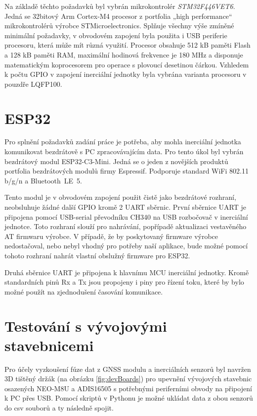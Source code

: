 

Na základě těchto požadavků byl vybrán mikrokontrolér \emph{STM32F446VET6}. Jedná se 32bitový Arm Cortex-M4 procesor z portfolia „high performance“ mikrokontrolérů výrobce STMicroelectronics. Splňuje všechny výše zmíněné minimální požadavky, v obvodovém zapojení byla použita i USB periferie procesoru, která může mít různá využití. Procesor obsahuje 512 kB paměti Flash a 128 kB paměti RAM, maximální hodinová frekvence je 180 MHz a disponuje matematickým koprocesorem pro operace s plovoucí desetinou čárkou. Vzhledem k počtu GPIO v zapojení inerciální jednotky byla vybrána varianta procesoru v pouzdře LQFP100. \cite{csdGtKJDMSdbwJ9r}

\section{ESP32}
Pro splnění požadavků zadání práce je potřeba, aby mohla inerciální jednotka komunikovat bezdrátově s PC zpracovávajícím data. Pro tento úkol byl vybrán bezdrátový modul ESP32-C3-Mini. Jedná se o jeden z novějších produktů portfolia bezdrátových modulů firmy Espressif. Podporuje standard WiFi 802.11 b/g/n a Bluetooth~LE~5. \cite{zJ7x5ye8Y5eJn1E2}

Tento modul je v obvodovém zapojení použit čistě jako bezdrátové rozhraní, neobsluhuje žádné další GPIO kromě 2 UART sběrnic. První sběrnice UART je připojena pomocí USB-serial převodníku CH340 na USB rozbočovač v inerciální jednotce. Toto rozhraní slouží pro nahrávání, popřípadě aktualizaci vestavěného AT firmwaru výrobce. V případě, že by poskytovaný firmware výrobce nedostačoval, nebo nebyl vhodný pro potřeby naší aplikace, bude možné pomocí tohoto rozhraní nahrát vlastní obslužný firmware pro ESP32.

Druhá sběrnice UART je připojena k hlavnímu MCU inerciální jednotky. Kromě standardních pinů Rx a Tx jsou propojeny i piny pro řízení toku, které by bylo možné použít na zjednodušení časování komunikace.

\section{Testování s vývojovými stavebnicemi}
Pro účely vyzkoušení fúze dat z GNSS modulu a inerciálních senzorů byl navržen 3D tištěný držák (na obrázku \ref{fig:devBoards}) pro upevnění vývojových stavebnic osazených NEO-M8U a ADIS16505 s potřebnými periferními obvody na připojení k PC přes USB. Pomocí skriptů v Pythonu je možné ukládat data z obou senzorů do csv souborů a ty následně spojit.

